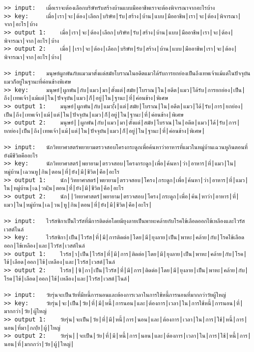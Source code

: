 \documentclass[11pt]{article}
\begin{document}
\begin{Verbatim}[commandchars=\\\{\}]
>> input:	เมื่อเราจะต้องเลือกบริษัทรับสร้างบ้านแบบมืออาชีพเราจะต้องพิจารณาจากอะไรบ้าง
>> key:		เมื่อ|เรา|จะ|ต้อง|เลือก|บริษัท|รับ|สร้าง|บ้าน|แบบ|มืออาชีพ|เรา|จะ|ต้อง|พิจารณา|จาก|อะไร|บ้าง
>> output 1:	เมื่อ|เรา|จะ|ต้อง|เลือก|บริษัท|รับ|สร้าง|บ้าน|แบบ|มืออาชีพ|เรา|จะ|ต้อง|พิจารณา|จาก|อะไร|บ้าง
>> output 2:	เมื่อ||เรา|จะ|ต้อง|เลือก|บริษัท|รับ|สร้าง|บ้าน|แบบ|มืออาชีพ|เรา|จะ|ต้อง|พิจารณา|จาก|อะไร|บ้าง|

>> input:	มนุษย์ผูกพันกับแมวมาตั้งแต่สมัยโบราณในอดีตแมวได้รับการยกย่องเป็นถึงเทพเจ้าแม้แต่ในปัจจุบันแมวก็อยู่ในฐานะที่ค่อนข้างพิเศษ
>> key:		มนุษย์|ผูกพัน|กับ|แมว|มา|ตั้งแต่|สมัย|โบราณ|ใน|อดีต|แมว|ได้รับ|การยกย่อง|เป็น|ถึง|เทพเจ้า|แม้แต่|ใน|ปัจจุบัน|แมว|ก็|อยู่|ใน|ฐานะ|ที่|ค่อนข้าง|พิเศษ
>> output 1:	มนุษย์|ผูกพัน|กับ|แมว|ั้ง|แต่|สมัย|โบราณ|ใน|อดีต|แมว|ได้|รับ|การ|ยกย่อง|เป็น|ถึง|เทพเจ้า|แม้|แต่|ใน|ปัจจุบัน|แมว|ก็|อยู่|ใน|ฐานะ|ที่|ค่อนข้าง|พิเศษ
>> output 2:	มนุษย์||ผูกพัน|กับ|แมว|มา|ตั้งแต่|สมัย|โบราณ|ใน|อดีต|แมว|ได้|รับ|การ|ยกย่อง|เป็น|ถึง|เทพเจ้า|แม้|แต่|ใน|ปัจจุบัน|แมว|ก็|อยู่|ใน|ฐานะ|ที่|ค่อนข้าง|พิเศษ|

>> input:	นักวิทยาศาสตร์พยายามตรวจสอบโครงกระดูกเพื่อค้นหาว่าอาหารที่แมวในหมู่บ้านเฉวนหูกินตอนที่ยังมีชีวิตคืออะไร
>> key:		นักวิทยาศาสตร์|พยายาม|ตรวจสอบ|โครงกระดูก|เพื่อ|ค้นหา|ว่า|อาหาร|ที่|แมว|ใน|หมู่บ้าน|เฉวนหู|กิน|ตอน|ที่|ยัง|มี|ชีวิต|คือ|อะไร
>> output 1:	นัก|วิทยาศาสตร์|พยายาม|ตรวจสอบ|โครง|กระดูก|เพื่อ|ค้นหา|ว่า|อาหาร|ที่|แมว|ใน|หมู่บ้าน|เฉ|วน|ิน|ตอน|ที่|ยัง|มี|ชีวิต|คือ|อะไร
>> output 2:	นัก||วิทยาศาสตร์|พยายาม|ตรวจสอบ|โครง|กระดูก|เพื่อ|ค้น|หาว่า|อาหาร|ที่|แมว|ใน|หมู่บ้าน|เฉ|วน|หู|กิน|ตอน|ที่|ยัง|มี|ชีวิต|คือ|อะไร|

>> input:	ไวรัสซิกาเป็นไวรัสที่มีการติดต่อโดยมียุงลายเป็นพาหะคล้ายกับโรคไข้เลือดออกไข้เหลืองและไวรัสเวสต์ไนล์
>> key:		ไวรัสซิกา|เป็น|ไวรัส|ที่|มี|การติดต่อ|โดย|มี|ยุงลาย|เป็น|พาหะ|คล้าย|กับ|โรคไข้เลือดออก|ไข้เหลือง|และ|ไวรัส|เวสต์ไนล์
>> output 1:	ไวรัส|า|เป็น|ไวรัส|ที่|มี|การ|ติดต่อ|โดย|มี|ยุงลาย|เป็น|พาหะ|คล้าย|กับ|โรค|ไข้|เลือด|ออก|ไข้|เหลือง|และ|ไวรัส|เวสต์|ไนล์
>> output 2:	ไวรัส||ซิ|กา|เป็น|ไวรัส|ที่|มี|การ|ติดต่อ|โดย|มี|ยุงลาย|เป็น|พาหะ|คล้าย|กับ|โรค|ไข้|เลือด|ออก|ไข้|เหลือง|และ|ไวรัส|เวสต์|ไนล์|

>> input:	วัยรุ่นจะเป็นวัยที่มีหนี้การนอนและต้องการเวลาในการใช้หนี้การนอนที่มากกว่าวัยผู้ใหญ่
>> key:		วัยรุ่น|จะ|เป็น|วัย|ที่|มี|หนี้|การนอน|และ|ต้องการ|เวลา|ใน|การใช้หนี้|การนอน|ที่|มากกว่า|วัย|ผู้ใหญ่
>> output 1:	วัยรุ่น|จะเป็น|วัย|ที่|มี|หนี้|การ|นอน|และ|ต้องการ|เวลา|ใน|การ|ใช้|หนี้|การ|นอน|ที่มา|กก|ัย|ผู้|ใหญ่
>> output 2:	วัยรุ่น||จะเป็น|วัย|ที่|มี|หนี้|การ|นอน|และ|ต้องการ|เวลา|ใน|การ|ใช้|หนี้|การ|นอน|ที่|มากกว่า|วัย|ผู้|ใหญ่|


\end{Verbatim}
\end{document}
